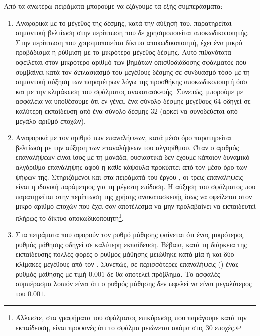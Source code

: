Από τα ανωτέρω πειράματα μπορούμε να εξάγουμε τα εξής συμπεράσματα:
\begin{enumerate}
    \item Αναφορικά με το μέγεθος της δέσμης, κατά την αύξησή του, παρατηρείται σημαντική βελτίωση στην περίπτωση που δε χρησιμοποιείται αποκωδικοποιητής. Στην περίπτωση που χρησιμοποιείται δίκτυο αποκωδικοποιητή, έχει ένα μικρό προβάδισμα η ρύθμιση με το μικρότερο μέγεθος δέσμης. Αυτό πιθανότατα οφείλεται στον μικρότερο αριθμό των βημάτων οπισθοδιάδοσης σφάλματος που συμβαίνει κατά τον διπλασιασμό του μεγέθους δέσμης σε συνδυασμό τόσο με τη σημαντική αύξηση των παραμέτρων λόγω της προσθήκης αποκωδικοποιητή όσο και με την κλιμάκωση του σφάλματος ανακατασκευής. Συνεπώς, μπορούμε με ασφάλεια να υποθέσουμε ότι εν γένει, ένα σύνολο δέσμης μεγέθους 64 οδηγεί σε καλύτερη εκπαίδευση από ένα σύνολο δέσμης 32 (αρκεί να συνοδεύεται από μεγάλο αριθμό εποχών).
    \item Αναφορικά με τον αριθμό των επαναλήψεων, κατά μέσο όρο παρατηρείται βελτίωση με την αύξηση των επαναλήψεων του αλγορίθμου. Όταν ο αριθμός επαναλήψεων είναι ίσος με τη μονάδα, ουσιαστικά δεν έχουμε κάποιον δυναμικό αλγόριθμο επανάληψης αφού η κάθε κάψουλα  προκύπτει από τον μέσο όρο των ψήφων της. Στηριζόμενοι και στα πειράματά του έργου \cite{sabour2017dynamic}, οι τρεις επαναλήψεις είναι η ιδανική παράμετρος για τη μέγιστη επίδοση. Η αύξηση του σφάλματος που παρατηρείται στην περίπτωση της χρήσης ανακατασκευής ίσως να οφείλεται στον μικρό αριθμό εποχών που έχει σαν αποτέλεσμα να μην προλαβαίνει να εκπαιδευτεί πλήρως το δίκτυο αποκωδικοποιητή\footnote{Άλλωστε, στα γραφήματα του σφάλματος επικύρωσης που παράγουμε κατά την εκπαίδευση, είναι προφανές ότι το σφάλμα μειώνεται ακόμα στις 30 εποχές.}.
    \item Στα πειράματα που αφορούν τον ρυθμό μάθησης φαίνεται ότι ένας μικρότερος ρυθμός μάθησης οδηγεί σε καλύτερη εκπαίδευση. Βέβαια, κατά τη διάρκεια της εκπαίδευσης πολλές φορές ο ρυθμός μάθησης μειώθηκε κατά μία ή και δύο κλίμακες μεγέθους από τον . Συνεπώς, σε περισσότερες επαναλήψεις () ένας ρυθμός μάθησης με τιμή $0.001$ δε θα αποτελεί πρόβλημα. Το ασφαλές συμπέρασμα λοιπόν είναι ότι ο ρυθμός μάθησης δεν ωφελεί να είναι μεγαλύτερος του $0.001$.
\end{enumerate}

